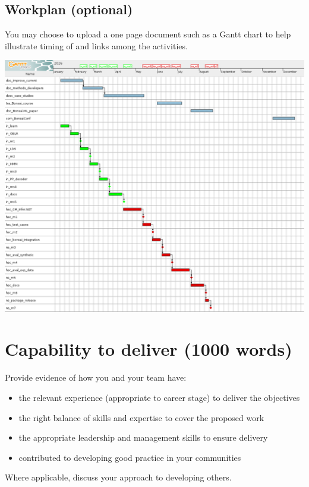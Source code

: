 \documentclass[12pt]{article}
\newenvironment{instruction}{%
    \begin{tcolorbox}[colback=red!5,colframe=red,title=Instruction]%
}{%
    \end{tcolorbox}%
}
\begin{document}


\subsection{Workplan (optional)}

\begin{instruction}
You may choose to upload a one page document such as a Gantt chart to help illustrate timing of and links among the activities.
\end{instruction}

\begin{center}
    \includegraphics[width=7in]{figures/ganttChart1.png}
\end{center}

\pagebreak

\section{Capability to deliver (1000 words)}

\begin{instruction}
Provide evidence of how you and your team have:

    \begin{itemize}
        \item the relevant experience (appropriate to career stage) to deliver the objectives
        \item the right balance of skills and expertise to cover the proposed work
        \item the appropriate leadership and management skills to ensure delivery
        \item contributed to developing good practice in your communities
    \end{itemize}

Where applicable, discuss your approach to developing others.

\end{instruction}
\end{document}
